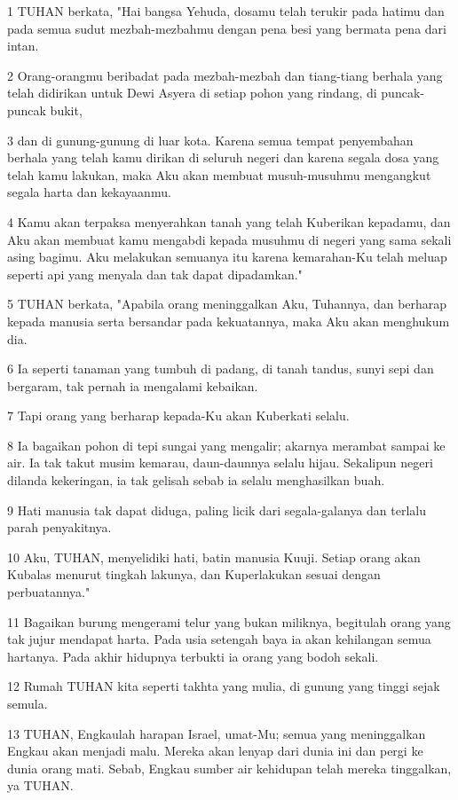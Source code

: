 \par 1 TUHAN berkata, "Hai bangsa Yehuda, dosamu telah terukir pada hatimu dan pada semua sudut mezbah-mezbahmu dengan pena besi yang bermata pena dari intan.
\par 2 Orang-orangmu beribadat pada mezbah-mezbah dan tiang-tiang berhala yang telah didirikan untuk Dewi Asyera di setiap pohon yang rindang, di puncak-puncak bukit,
\par 3 dan di gunung-gunung di luar kota. Karena semua tempat penyembahan berhala yang telah kamu dirikan di seluruh negeri dan karena segala dosa yang telah kamu lakukan, maka Aku akan membuat musuh-musuhmu mengangkut segala harta dan kekayaanmu.
\par 4 Kamu akan terpaksa menyerahkan tanah yang telah Kuberikan kepadamu, dan Aku akan membuat kamu mengabdi kepada musuhmu di negeri yang sama sekali asing bagimu. Aku melakukan semuanya itu karena kemarahan-Ku telah meluap seperti api yang menyala dan tak dapat dipadamkan."
\par 5 TUHAN berkata, "Apabila orang meninggalkan Aku, Tuhannya, dan berharap kepada manusia serta bersandar pada kekuatannya, maka Aku akan menghukum dia.
\par 6 Ia seperti tanaman yang tumbuh di padang, di tanah tandus, sunyi sepi dan bergaram, tak pernah ia mengalami kebaikan.
\par 7 Tapi orang yang berharap kepada-Ku akan Kuberkati selalu.
\par 8 Ia bagaikan pohon di tepi sungai yang mengalir; akarnya merambat sampai ke air. Ia tak takut musim kemarau, daun-daunnya selalu hijau. Sekalipun negeri dilanda kekeringan, ia tak gelisah sebab ia selalu menghasilkan buah.
\par 9 Hati manusia tak dapat diduga, paling licik dari segala-galanya dan terlalu parah penyakitnya.
\par 10 Aku, TUHAN, menyelidiki hati, batin manusia Kuuji. Setiap orang akan Kubalas menurut tingkah lakunya, dan Kuperlakukan sesuai dengan perbuatannya."
\par 11 Bagaikan burung mengerami telur yang bukan miliknya, begitulah orang yang tak jujur mendapat harta. Pada usia setengah baya ia akan kehilangan semua hartanya. Pada akhir hidupnya terbukti ia orang yang bodoh sekali.
\par 12 Rumah TUHAN kita seperti takhta yang mulia, di gunung yang tinggi sejak semula.
\par 13 TUHAN, Engkaulah harapan Israel, umat-Mu; semua yang meninggalkan Engkau akan menjadi malu. Mereka akan lenyap dari dunia ini dan pergi ke dunia orang mati. Sebab, Engkau sumber air kehidupan telah mereka tinggalkan, ya TUHAN.
